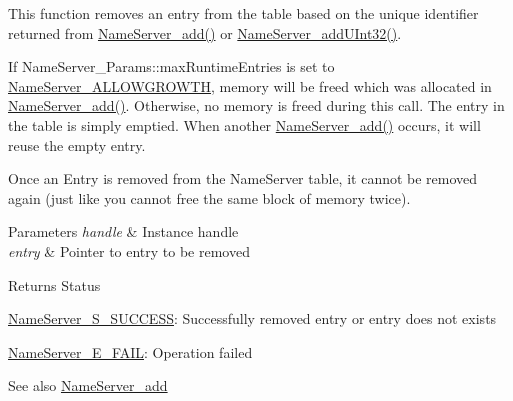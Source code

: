 This function removes an entry from the table based on the unique identifier returned from \hyperlink{_name_server_8h_ad7d45ed8fe5bcd1f10da5914c8da39f5}{NameServer\_\-add()} or \hyperlink{_name_server_8h_ac130195a04a34dfa2daba6ec3fff65d6}{NameServer\_\-addUInt32()}.

If NameServer\_\-Params::maxRuntimeEntries is set to \hyperlink{_name_server_8h_aee02296103cd2e162143d40c917697d7}{NameServer\_\-ALLOWGROWTH}, memory will be freed which was allocated in \hyperlink{_name_server_8h_ad7d45ed8fe5bcd1f10da5914c8da39f5}{NameServer\_\-add()}. Otherwise, no memory is freed during this call. The entry in the table is simply emptied. When another \hyperlink{_name_server_8h_ad7d45ed8fe5bcd1f10da5914c8da39f5}{NameServer\_\-add()} occurs, it will reuse the empty entry.

Once an Entry is removed from the NameServer table, it cannot be removed again (just like you cannot free the same block of memory twice).


\begin{DoxyParams}{Parameters}
{\em handle} & Instance handle \\
\hline
{\em entry} & Pointer to entry to be removed\\
\hline
\end{DoxyParams}
\begin{DoxyReturn}{Returns}
Status
\begin{DoxyItemize}
\item \hyperlink{_name_server_8h_a49cbe5edf8e519b17e323d01431e8161}{NameServer\_\-S\_\-SUCCESS}: Successfully removed entry or entry does not exists
\item \hyperlink{_name_server_8h_a2ffd6887c6aca49d73982fb226db679c}{NameServer\_\-E\_\-FAIL}: Operation failed
\end{DoxyItemize}
\end{DoxyReturn}
\begin{DoxySeeAlso}{See also}
\hyperlink{_name_server_8h_ad7d45ed8fe5bcd1f10da5914c8da39f5}{NameServer\_\-add} 
\end{DoxySeeAlso}
